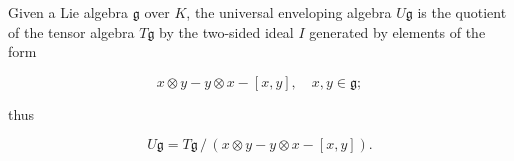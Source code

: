 Given a Lie algebra $\mathfrak{g}$ over $K$, the universal enveloping algebra $U\mathfrak{g}$ is the quotient of the tensor algebra $T\mathfrak{g}$ by the two-sided ideal $I$ generated by elements of the form

$$x \otimes y - y \otimes x - [x, y], \quad x, y \in \mathfrak{g};$$

thus

$$U\mathfrak{g} = T\mathfrak{g} \,/\, (x \otimes y - y \otimes x - [x, y]).$$
